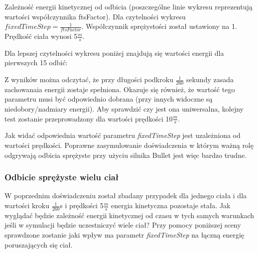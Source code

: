 

Zależność energii kinetycznej od odbicia (poszczególne linie wykresu
reprezentują wartości współczynnika ftsFactor). Dla czytelności wykresu $
fixedTimeStep = \frac{1}{ftsFactor} $. Współczynnik sprężystości został
ustawiony na 1. Prędkość ciała wynosi 5$\frac{m}{s}$.



Dla lepszej czytelności wykresu poniżej znajdują się wartości energii dla
pierwszych 15 odbić:



Z wyników można odczytać, że przy długości podkroku $ \frac{1}{260} $ sekundy
zasada zachowanaia energii zostaje spełniona. Okazuje się również, że wartość
tego parametru musi być odpowiednio dobrana (przy innych widoczne są
niedobory/nadmiary energii). Aby sprawdzić czy jest ona uniwersalna, kolejny
test zostanie przeprowadzony dla wartości prędkości 10$\frac{m}{s}$.



Jak widać odpowiednia wartość parametru \emph{fixedTimeStep} jest uzależniona od
wartości prędkości. Poprawne zasymulowanie doświadczenia w którym ważną rolę
odgrywają odbicia sprężyste przy użyciu silnika Bullet jest więc bardzo trudne.

\subsubsection{Odbicie sprężyste wielu ciał}\label{sec:odbicieWieluCial}

W poprzednim doświadczeniu został zbadany przypadek dla jednego ciała i dla
wartości kroku $ \frac{1}{260} $s i prędkości 5$ \frac{m}{s} $ energia
kinetyczna pozostaje stała. Jak wyglądać będzie zależność energii kinetycznej od
czasu w tych samych warunkach jeśli w symulacji będzie uczestniczyć wiele ciał?
Przy pomocy poniższej sceny sprawdzone zostanie jaki wpływ ma parametr
\emph{fixedTimeStep} na łączną energię poruszających się ciał.

